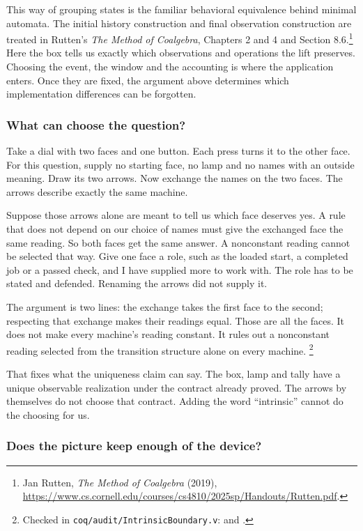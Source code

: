 \documentclass[11pt,twoside]{article}
\theoremstyle{thielethm}
\theoremstyle{thieledef}
\theoremstyle{thieledef}
\theoremstyle{thieledef}
\theoremstyle{thielethm}
\theoremstyle{thieleobs}
\theoremstyle{thielethm}
\begin{document}
This way of grouping states is the familiar behavioral equivalence behind
minimal automata. The initial history construction and final observation
construction are treated in Rutten's \emph{The Method of Coalgebra},
Chapters 2 and 4 and Section 8.6.\footnote{Jan Rutten, \emph{The Method of
Coalgebra} (2019), \url{https://www.cs.cornell.edu/courses/cs4810/2025sp/Handouts/Rutten.pdf}.}
Here the box tells us exactly which observations and operations the lift
preserves. Choosing the event, the window and the accounting is where the
application enters. Once they are fixed, the argument above determines
which implementation differences can be forgotten.


\subsubsection*{What can choose the question?}

Take a dial with two faces and one button. Each press turns it to the other
face. For this question, supply no starting face, no lamp and no names with
an outside meaning. Draw its two arrows. Now exchange the names on the two
faces. The arrows describe exactly the same machine.

Suppose those arrows alone are meant to tell us which face deserves yes.
A rule that does not depend on our choice of names must give the exchanged
face the same reading. So both faces get the same answer. A nonconstant
reading cannot be selected that way. Give one face a role, such as the loaded
start, a completed job or a passed check, and I have supplied more to work
with. The role has to be stated and defended. Renaming the arrows did not
supply it.

The argument is two lines: the exchange takes the first face to the second;
respecting that exchange makes their readings equal. Those are all the
faces. It does not make every machine's reading constant. It rules out a
nonconstant reading selected from the transition structure alone on every
machine. \footnote{Checked in \texttt{coq/audit/IntrinsicBoundary.v}:
 and
.}

That fixes what the uniqueness claim can say. The box, lamp and tally have
a unique observable realization under the contract already proved. The
arrows by themselves do not choose that contract. Adding the word
``intrinsic'' cannot do the choosing for us.

\subsubsection*{Does the picture keep enough of the device?}
\end{document}
